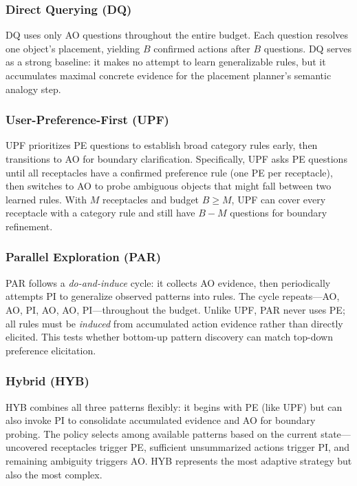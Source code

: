 \documentclass[a4paper,fleqn]{cas-sc}
\begin{document}
\subsubsection{Direct Querying (DQ)}

DQ uses only AO questions throughout the entire budget. Each question resolves one object's placement, yielding $B$ confirmed actions after $B$ questions. DQ serves as a strong baseline: it makes no attempt to learn generalizable rules, but it accumulates maximal concrete evidence for the placement planner's semantic analogy step.

\subsubsection{User-Preference-First (UPF)}

UPF prioritizes PE questions to establish broad category rules early, then transitions to AO for boundary clarification. Specifically, UPF asks PE questions until all receptacles have a confirmed preference rule (one PE per receptacle), then switches to AO to probe ambiguous objects that might fall between two learned rules. With $M$ receptacles and budget $B \geq M$, UPF can cover every receptacle with a category rule and still have $B - M$ questions for boundary refinement.

\subsubsection{Parallel Exploration (PAR)}

PAR follows a \emph{do-and-induce} cycle: it collects AO evidence, then periodically attempts PI to generalize observed patterns into rules. The cycle repeats---AO, AO, PI, AO, AO, PI---throughout the budget. Unlike UPF, PAR never uses PE; all rules must be \emph{induced} from accumulated action evidence rather than directly elicited. This tests whether bottom-up pattern discovery can match top-down preference elicitation.

\subsubsection{Hybrid (HYB)}

HYB combines all three patterns flexibly: it begins with PE (like UPF) but can also invoke PI to consolidate accumulated evidence and AO for boundary probing. The policy selects among available patterns based on the current state---uncovered receptacles trigger PE, sufficient unsummarized actions trigger PI, and remaining ambiguity triggers AO. HYB represents the most adaptive strategy but also the most complex.
\end{document}
